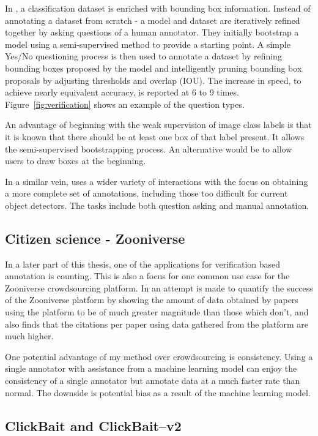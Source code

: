 In \cite{Papadopoulos2016}, a classification dataset is enriched with bounding box information. Instead of annotating a dataset from scratch - a model and dataset are iteratively refined together by asking questions of a human annotator. They initially bootstrap a model using a semi-supervised method  \cite{Cinbis2017} to provide a starting point. A simple Yes/No questioning process is then used to annotate a dataset by refining bounding boxes proposed by the model and intelligently pruning bounding box proposals by adjusting thresholds and overlap (\gls{IOU}). The increase in speed, to achieve nearly equivalent accuracy, is reported at 6 to 9 times.  Figure~\ref{fig:verification} shows an example of the question types.

An advantage of beginning with the weak supervision of image class labels is that it is known that there should be at least one box of that label present. It allows the semi-supervised bootstrapping process. An alternative would be to allow users to draw boxes at the beginning. 

In a similar vein, \cite{Russakovsky2015a} uses a wider variety of interactions with the focus on obtaining a more complete set of annotations, including those too difficult for current object detectors. The tasks include both question asking and manual annotation.


\subsection{Citizen science - Zooniverse \cite{Zooniverse}}

In a later part of this thesis, one of the applications for verification based annotation is counting. This is also a focus for one common use case for the Zooniverse crowdsourcing platform. In \cite{Watson2018} an attempt is made to quantify the success of the Zooniverse platform by showing the amount of data obtained by papers using the platform to be of much greater magnitude than those which don't, and also finds that the citations per paper using data gathered from the platform are much higher. 

One potential advantage of my method over crowdsourcing is consistency. Using a single annotator with assistance from a machine learning model can enjoy the consistency of a single annotator but annotate data at a much faster rate than normal. The downside is potential bias as a result of the machine learning model.

\subsection{ClickBait and ClickBait--v2 \cite{Teng2017, Teng2018}}


